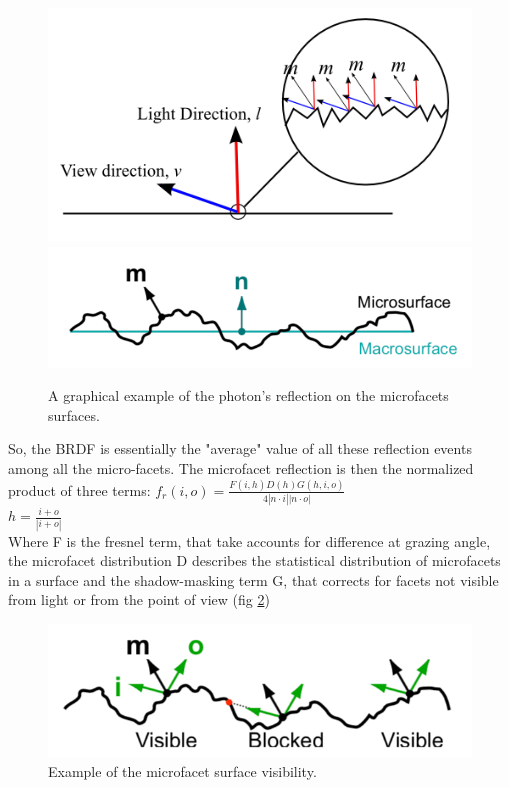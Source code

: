 \documentclass[11pt]{article}
\begin{document}
\begin{figure}[ht]
	\centering
	\includegraphics[width=0.5\linewidth]{img/microfacet}
	\includegraphics[width=0.5\linewidth]{img/microfacet2}
	\caption{A graphical example of the photon's reflection on the microfacets surfaces.}
	\label{fig:microfacet}
\end{figure}

So, the BRDF is essentially the "average" value of all these reflection events among all the micro-facets.
The microfacet reflection is then the normalized product of three terms:
$f_r(i,o)=\frac{F(i,h)D(h)G(h,i,o)}{4|n\cdot i||n\cdot o|}$\\
$h= \frac{i+o}{|i+o|}$ \\
Where F is the fresnel term, that take accounts for difference at grazing angle, the microfacet distribution D describes the statistical distribution of microfacets in a surface and the shadow-masking term G, that corrects for facets not visible from light or from the point of view (fig \ref{fig:visible})

\begin{figure}[ht]
	\centering
	\includegraphics[width=0.5\linewidth]{img/visible}
	\caption{Example of the microfacet surface visibility.}
	\label{fig:visible}
\end{figure}
\end{document}
